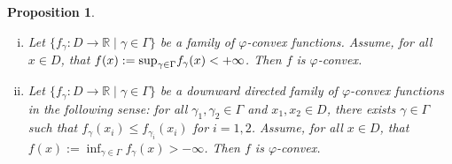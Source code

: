 \documentclass[12pt,leqno]{amsart}
\newtheorem{proposition}[theorem]{Proposition}
\theoremstyle{definition}
\begin{document}
{{\begin{proposition}
{\begin{enumerate}[(i)]
    In particular, the set of $\varphi$-convex functions on $D$ is convex.
    \item Let $\{f_{\gamma}:D\to{\mathbb{R}}\mid\gamma\in \Gamma \}$ be a family of
    $\varphi$-convex functions. Assume, for all $x\in D$, that
    $f(x):={\mathop{\mbox{\rm sup}}}_{\gamma\in \Gamma}f_{\gamma}(x)<+\infty$. Then $f$ is $\varphi$-convex.
    \item Let $\{f_{\gamma}:D\to{\mathbb{R}}\mid\gamma\in \Gamma \}$ be a downward directed
    family of $\varphi$-convex functions in the following sense:
    for all $\gamma_1,\gamma_2\in\Gamma$ and $x_1,x_2\in D$, there exists $\gamma\in\Gamma$
    such that $f_\gamma(x_i)\leq f_{\gamma_i}(x_i)$ for $i=1,2$.
    Assume, for all $x\in D$, that $f(x):=\inf_{\gamma\in \Gamma}f_{\gamma}(x)>-\infty$.
    Then $f$ is $\varphi$-convex.
\end{enumerate}}\end{proposition}}}
\end{document}
